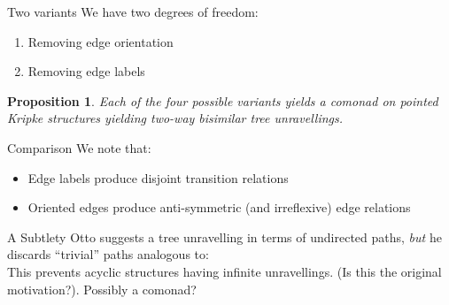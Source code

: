 \documentclass{beamer}
\newtheorem{proposition}{Proposition}
\begin{document}
\begin{frame}{Two variants}
    We have two degrees of freedom:
    \begin{enumerate}
        \item Removing edge orientation
        \item Removing edge labels
    \end{enumerate}
    \begin{proposition}
    Each of the four possible variants yields a comonad on pointed Kripke structures yielding two-way bisimilar tree unravellings.
    \end{proposition}
    \begin{block}{Comparison}
    We note that:
    \begin{itemize}
        \item Edge labels produce disjoint transition relations
        \item Oriented edges produce anti-symmetric (and irreflexive) edge relations
    \end{itemize}
    \end{block}
\end{frame}

\begin{frame}{A Subtlety}
Otto suggests a tree unravelling in terms of undirected paths, \emph{but} he discards ``trivial'' paths analogous to:
\begin{equation*}
    [a \rightarrow b \leftarrow a]
\end{equation*}
This prevents acyclic structures having infinite unravellings. (Is this the original motivation?).
\pause
Possibly a comonad?
\end{frame}
\end{document}
